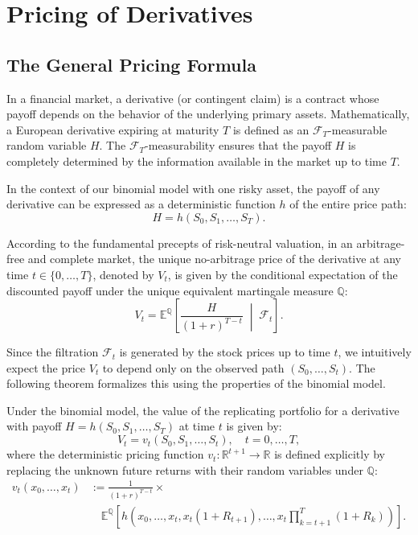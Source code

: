 \chapter{Pricing of Derivatives}

\section{The General Pricing Formula}

In a financial market, a derivative (or contingent claim) is a contract whose payoff depends on the behavior of the underlying primary assets. Mathematically, a European derivative expiring at maturity $T$ is defined as an $\mathcal{F}_T$-measurable random variable $H$. The $\mathcal{F}_T$-measurability ensures that the payoff $H$ is completely determined by the information available in the market up to time $T$.

In the context of our binomial model with one risky asset, the payoff of any derivative can be expressed as a deterministic function $h$ of the entire price path:
\begin{equation}
    H = h(S_0, S_1, \dots, S_T).
\end{equation}

According to the fundamental precepts of risk-neutral valuation, in an arbitrage-free and complete market, the unique no-arbitrage price of the derivative at any time $t \in \{0, \dots, T\}$, denoted by $V_t$, is given by the conditional expectation of the discounted payoff under the unique equivalent martingale measure $\mathbb{Q}$:
\begin{equation}
    V_t = \mathbb{E}^\mathbb{Q} \left[ \frac{H}{(1+r)^{T-t}} \;\middle|\; \mathcal{F}_t \right].
\end{equation}

Since the filtration $\mathcal{F}_t$ is generated by the stock prices up to time $t$, we intuitively expect the price $V_t$ to depend only on the observed path $(S_0, \dots, S_t)$. The following theorem formalizes this using the properties of the binomial model.

\begin{theorem}
    Under the binomial model, the value of the replicating portfolio for a derivative with payoff $H = h(S_0, S_1, \dots, S_T)$ at time $t$ is given by:
    \begin{equation}
        V_t = v_t(S_0, S_1, \dots, S_t), \quad t = 0, \dots, T,
    \end{equation}
    where the deterministic pricing function $v_t : \mathbb{R}^{t+1} \to \mathbb{R}$ is defined explicitly by replacing the unknown future returns with their random variables under $\mathbb{Q}$:
    \begin{align}
        v_t(x_0, \dots, x_t) &:= \frac{1}{(1+r)^{T-t}} \times \nonumber \\
        &\quad \mathbb{E}^\mathbb{Q} \left[ h\left(x_0, \dots, x_t, x_t(1+R_{t+1}), \dots, x_t \prod_{k=t+1}^T (1+R_k)\right) \right]. \label{eq:general_vt}
    \end{align}
\end{theorem}

